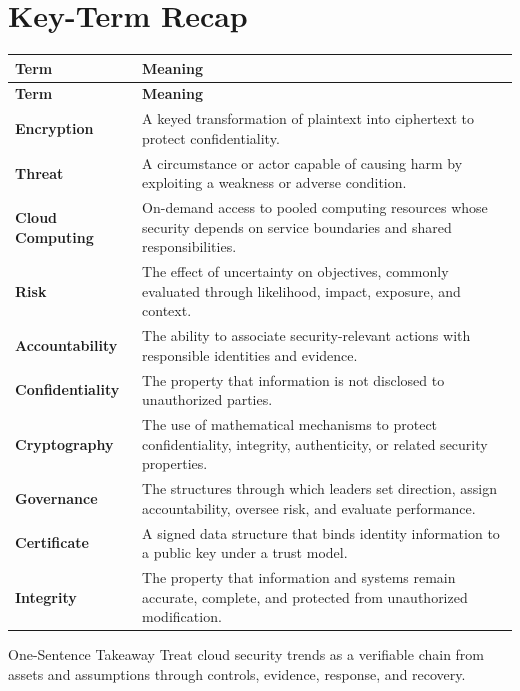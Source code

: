 \documentclass[11pt,letterpaper]{article}
\begin{document}
\section*{Key-Term Recap}
\begin{longtable}{>{\raggedright\arraybackslash}p{}>{\raggedright\arraybackslash}p{}}
\toprule\rowcolor{Navy}\color{white}\textbf{Term} & \color{white}\textbf{Meaning}\\\midrule
\endfirsthead
\toprule\rowcolor{Navy}\color{white}\textbf{Term} & \color{white}\textbf{Meaning}\\\midrule
\endhead
\textbf{Encryption} & A keyed transformation of plaintext into ciphertext to protect confidentiality. \\\midrule
\textbf{Threat} & A circumstance or actor capable of causing harm by exploiting a weakness or adverse condition. \\\midrule
\textbf{Cloud Computing} & On-demand access to pooled computing resources whose security depends on service boundaries and shared responsibilities. \\\midrule
\textbf{Risk} & The effect of uncertainty on objectives, commonly evaluated through likelihood, impact, exposure, and context. \\\midrule
\textbf{Accountability} & The ability to associate security-relevant actions with responsible identities and evidence. \\\midrule
\textbf{Confidentiality} & The property that information is not disclosed to unauthorized parties. \\\midrule
\textbf{Cryptography} & The use of mathematical mechanisms to protect confidentiality, integrity, authenticity, or related security properties. \\\midrule
\textbf{Governance} & The structures through which leaders set direction, assign accountability, oversee risk, and evaluate performance. \\\midrule
\textbf{Certificate} & A signed data structure that binds identity information to a public key under a trust model. \\\midrule
\textbf{Integrity} & The property that information and systems remain accurate, complete, and protected from unauthorized modification. \\\midrule
\bottomrule
\end{longtable}
\begin{CornellExamBox}{One-Sentence Takeaway}
Treat cloud security trends as a verifiable chain from assets and assumptions through controls, evidence, response, and recovery.
\end{CornellExamBox}
\end{document}
